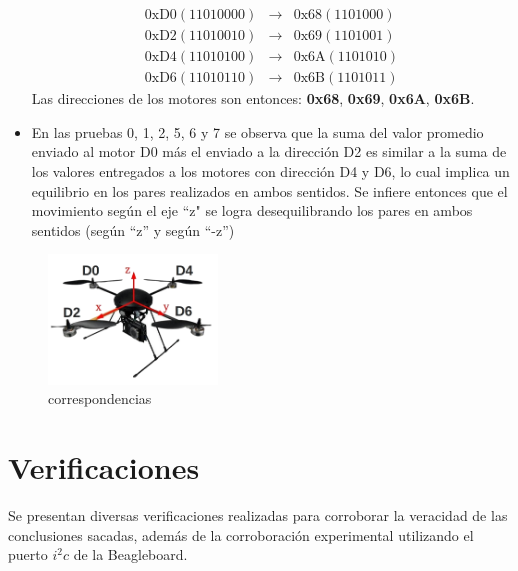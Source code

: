 \documentclass[main]{subfiles}
\begin{document}
\begin{itemize}
\begin{eqnarray}
\mathrm{0xD0} (11010000) &\longrightarrow &\mathrm{0x68} (1101000) \\
\mathrm{0xD2} (11010010) &\longrightarrow &\mathrm{0x69} (1101001) \\
\mathrm{0xD4} (11010100) &\longrightarrow &\mathrm{0x6A} (1101010) \\
\mathrm{0xD6} (11010110) &\longrightarrow &\mathrm{0x6B} (1101011) 
\end{eqnarray}
Las direcciones de los motores son entonces: \textbf{0x68}, \textbf{0x69}, \textbf{0x6A}, \textbf{0x6B}.
\item En las pruebas 0, 1, 2, 5, 6 y 7 se observa que la suma del valor promedio enviado al motor D0 más el enviado a la dirección D2 es similar a la suma de los valores entregados a los motores con dirección D4 y D6, lo cual implica un equilibrio en los pares realizados en ambos sentidos. Se infiere entonces que el movimiento según el eje ``z" se logra desequilibrando los pares en ambos sentidos (según ``z'' y según ``-z'')
\end{itemize}

\begin{figure}[h!]
	\centering
	\includegraphics[width=0.4\textwidth]{./pics_sniffer/correspondencias.jpg}
	\caption{correspondencias}
	\label{fig:correspondencias}
\end{figure}

\section{Verificaciones}
Se presentan diversas verificaciones realizadas para corroborar la veracidad de las conclusiones sacadas, además de la corroboración experimental utilizando el puerto $i^2c$ de la Beagleboard.\\
\end{document}
